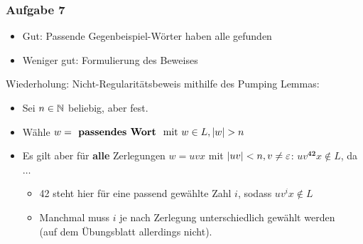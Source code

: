 \begin{frame}
	\frametitle{Aufgabe 7}
	
	\begin{itemize}
		\item Gut: Passende Gegenbeispiel-Wörter haben alle gefunden
		\item Weniger gut: Formulierung des Beweises
	\end{itemize}
	
	\pause
	
	\vspace{0,75cm}
	
	Wiederholung: Nicht-Regularitätsbeweis mithilfe des Pumping Lemmas:
	
	\begin{itemize}
		\item Sei $n \in \mathbb{N}$ beliebig, aber fest.
		\item Wähle $w=\text{\textbf{ passendes Wort } mit } w\in L, \left\vert w \right\vert > n$
		\item Es gilt aber für \textbf{alle} Zerlegungen $w=uvx$ mit $\left\vert uv \right\vert < n, v\neq \varepsilon$: $uv^\mathbf{42}x \not\in L$, da $\hdots$
		\begin{itemize}
			\item 42 steht hier für eine passend gewählte Zahl $i$, sodass $uv^ix \not\in L$
			\item Manchmal muss $i$ je nach Zerlegung unterschiedlich gewählt werden \\ (auf dem Übungsblatt allerdings nicht).
		\end{itemize}
	\end{itemize}
\end{frame}


